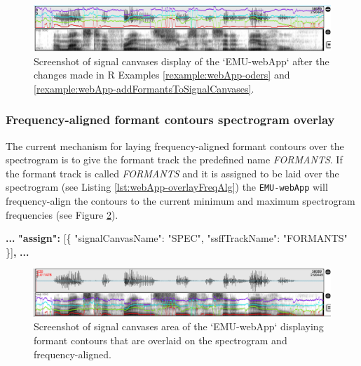 \documentclass[]{book}
\newenvironment{Shaded}{\begin{snugshade}}{\end{snugshade}}
\newcommand{\DataTypeTok}[1]{\textcolor[rgb]{0.13,0.29,0.53}{#1}}
\newcommand{\ErrorTok}[1]{\textcolor[rgb]{0.64,0.00,0.00}{\textbf{#1}}}
\newcommand{\FunctionTok}[1]{\textcolor[rgb]{0.00,0.00,0.00}{#1}}
\newcommand{\OtherTok}[1]{\textcolor[rgb]{0.56,0.35,0.01}{#1}}
\newcommand{\StringTok}[1]{\textcolor[rgb]{0.31,0.60,0.02}{#1}}
\theoremstyle{definition}
\theoremstyle{definition}
\theoremstyle{definition}
\theoremstyle{remark}
\begin{document}
\begin{figure}

{\centering \includegraphics[width=1\linewidth]{pics/emu-webAppOverlay} 

}

\caption{Screenshot of signal canvases display of the `EMU-webApp` after the changes made in R Examples \ref{rexample:webApp-oders} and \ref{rexample:webApp-addFormantsToSignalCanvases}.}\label{fig:webApp-overlay1}
\end{figure}

\hypertarget{subsubsec:emu-webAppFreqAlignedFormants}{%
\subsubsection{Frequency-aligned formant contours spectrogram
overlay}\label{subsubsec:emu-webAppFreqAlignedFormants}}

The current mechanism for laying frequency-aligned formant contours over
the spectrogram is to give the formant track the predefined name
\emph{FORMANTS}. If the formant track is called \emph{FORMANTS} and it
is assigned to be laid over the spectrogram (see Listing
\ref{lst:webApp-overlayFreqAlg}) the \texttt{EMU-webApp} will
frequency-align the contours to the current minimum and maximum
spectrogram frequencies (see Figure \ref{fig:webApp-overlay2}).

\begin{Shaded}
\begin{Highlighting}[]
\ErrorTok{...}
\ErrorTok{"assign":} \OtherTok{[}\FunctionTok{\{}
    \DataTypeTok{"signalCanvasName"}\FunctionTok{:} \StringTok{"SPEC"}\FunctionTok{,}
    \DataTypeTok{"ssffTrackName"}\FunctionTok{:} \StringTok{"FORMANTS"}
\FunctionTok{\}}\OtherTok{]}\ErrorTok{,}
\ErrorTok{...}
\end{Highlighting}
\end{Shaded}

\begin{figure}

{\centering \includegraphics[width=1\linewidth]{pics/emu-webAppOverlayFreqAlg} 

}

\caption{Screenshot of signal canvases area of the `EMU-webApp` displaying formant contours that are overlaid on the spectrogram and frequency-aligned.}\label{fig:webApp-overlay2}
\end{figure}
\end{document}
